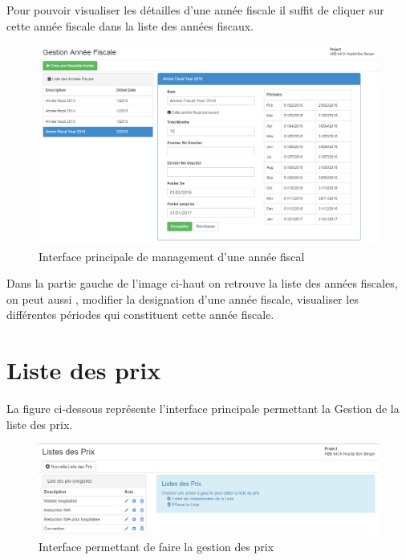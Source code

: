 \documentclass[12pt,a4paper]{report}
\begin{document}
Pour pouvoir visualiser les détailles d'une année fiscale il suffit de cliquer sur cette année fiscale dans la liste des années fiscaux.

\begin{figure}[h]
\begin{center}
\includegraphics[width=12cm]{pic/FormAddFiscYear.png}
\end{center}
\caption{Interface principale de management d'une année fiscal}
\label{Interface principale de management d'une année fiscal}
\end{figure}

Dans la partie gauche de l'image ci-haut on retrouve la liste des années fiscales, on peut aussi , modifier la designation d'une année fiscale, visualiser les différentes périodes qui constituent cette année fiscale. 

\newpage
\section{Liste des prix}
La figure ci-dessous représente l'interface principale permettant la Gestion de la liste des prix. 
\begin{figure}[h]
\begin{center}
\includegraphics[width=12cm]{pic/ListePrix.png}
\end{center}
\caption{Interface permettant de faire la gestion des prix}
\label{Interface permettant de faire la gestion des prix}
\end{figure}
\end{document}
